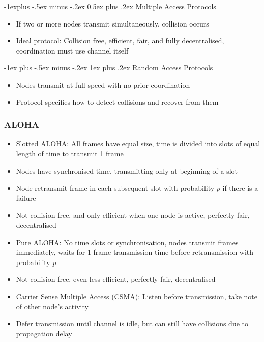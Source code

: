 \documentclass[10pt, landscape]{article}
\makeatletter
\renewcommand{\section}{\@startsection{section}{1}{0mm}%
                                {-1ex plus -.5ex minus -.2ex}%
                                {0.5ex plus .2ex}%
                                {\normalfont\large\bfseries}}
\renewcommand{\section}{\@startsection{section}{2}{0mm}%
                                {-1explus -.5ex minus -.2ex}%
                                {0.5ex plus .2ex}%
                                {\normalfont\normalsize\bfseries}}
\renewcommand{\subsection}{\@startsection{subsection}{3}{0mm}%
                                {-1ex plus -.5ex minus -.2ex}%
                                {1ex plus .2ex}%
                                {\normalfont\small\bfseries}}%
\makeatother
\begin{document}
\begin{multicols*}{3}
\section{Multiple Access Protocols}
\begin{itemize}
    \item If two or more nodes transmit simultaneously, collision occurs
    \item Ideal protocol: Collision free, efficient, fair, and fully decentralised, coordination must use channel itself
\end{itemize}

\subsection{Random Access Protocols}
\begin{itemize}
    \item Nodes transmit at full speed with no prior coordination
    \item Protocol specifies how to detect collisions and recover from them
\end{itemize}

\subsubsection{ALOHA}
\begin{itemize}
    \item Slotted ALOHA: All frames have equal size, time is divided into slots of equal length of time to transmit 1 frame
    \item Nodes have synchronised time, transmitting only at beginning of a slot
    \item Node retransmit frame in each subsequent slot with probability $p$ if there is a failure
    \item Not collision free, and only efficient when one node is active, perfectly fair, decentralised
    \item Pure ALOHA: No time slots or synchronisation, nodes transmit frames immediately, waits for 1 frame transmission time before retransmission with probability $p$
    \item Not collision free, even less efficient, perfectly fair, decentralised
    \item Carrier Sense Multiple Access (CSMA): Listen before transmission, take note of other node's activity
    \item Defer transmission until channel is idle, but can still have collisions due to propagation delay
\end{itemize}


\end{multicols*}
\end{document}
